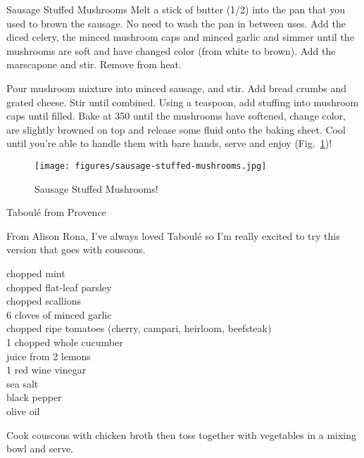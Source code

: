 \begin{entry}{Sausage Stuffed Mushrooms}
Melt a stick of butter (\SI{1/2}{\cup}) into the pan that you used to brown the
sausage. No need to wash the pan in between uses. Add the diced celery, the
minced mushroom caps and minced garlic and simmer until the mushrooms are soft
and have changed color (from white to brown). Add the marscapone and stir.
Remove from heat.

Pour mushroom mixture into minced sausage, and stir. Add bread crumbs and grated
cheese. Stir until combined. Using a teaspoon, add stuffing into mushroom caps
until filled. Bake at \SI{350}{\degreeF} until the mushrooms have softened,
change color, are slightly browned on top and release some fluid onto the baking
sheet. Cool until you're able to handle them with bare hands, serve and enjoy (Fig.~\ref{fig:sausage-stuffed-mushrooms})!
\begin{figure}
    \centering
    \texttt{[image: figures/sausage-stuffed-mushrooms.jpg]}
    \caption{Sausage Stuffed Mushrooms!}
    \label{fig:sausage-stuffed-mushrooms}
\end{figure}
\end{entry}

\begin{entry}{Taboul\'{e} from Provence}

\begin{open}
  From Alison Rona, I've always loved Taboul\'{e} so I'm really excited to try
  this version that goes with couscous.
\end{open}
\begin{ingredients}
    chopped mint\\
    chopped flat-leaf parsley\\
    chopped scallions\\
    6 cloves of minced garlic\\
    chopped ripe tomatoes (cherry, campari, heirloom, beefsteak)\\
    1 chopped whole cucumber\\
    juice from 2 lemons\\
    \SI{1}{\tblspoon} red wine vinegar\\
    sea salt\\
    black pepper\\
    olive oil
\end{ingredients}
Cook couscous with chicken broth then toss together with vegetables in a
mixing bowl and serve.
\end{entry}

